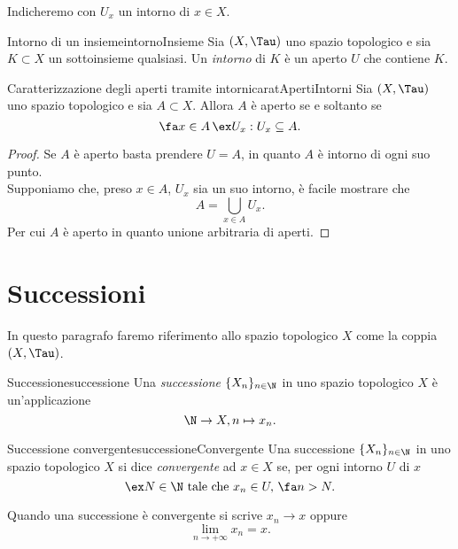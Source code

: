 \begin{notz}
    Indicheremo con \(U_x\) un intorno di \(x\in X\).
\end{notz}

\begin{defn}{Intorno di un insieme}{intornoInsieme}
    Sia \((X,\Tau)\) uno spazio topologico e sia \(K\subset X\) un sottoinsieme qualsiasi.
    Un \emph{intorno} di \(K\) è un aperto \(U\) che contiene \(K\).
\end{defn}

\begin{prop}{Caratterizzazione degli aperti tramite intorni}{caratApertiIntorni}
    Sia \((X,\Tau)\) uno spazio topologico e sia \(A\subset X\).
    Allora \(A\) è aperto se e soltanto se
    \[
        \fa x\in A \,\ex U_x:U_x\subseteq A.
    \]
\end{prop}

\begin{proof}
    \graffito{\(\Rightarrow)\)}Se \(A\) è aperto basta prendere \(U=A\), in quanto \(A\) è intorno di ogni suo punto.\\
    \graffito{\(\Leftarrow)\)}Supponiamo che, preso \(x\in A\), \(U_x\) sia un suo intorno, è facile mostrare che
    \[
        A=\bigcup_{x\in A}U_x.
    \]
    Per cui \(A\) è aperto in quanto unione arbitraria di aperti.
\end{proof}
\section{Successioni}

In questo paragrafo faremo riferimento allo spazio topologico \(X\) come la coppia \((X,\Tau)\).

\begin{defn}{Successione}{successione}
    Una \emph{successione} \(\{X_n\}_{n\in\N}\) in uno spazio topologico \(X\) è un'applicazione
    \[
        \N\to X,n\mapsto x_n.
    \]
\end{defn}

\begin{defn}{Successione convergente}{successioneConvergente}
    Una successione \(\{X_n\}_{n\in\N}\) in uno spazio topologico \(X\) si dice \emph{convergente} ad \(x\in X\) se, per ogni intorno \(U\) di \(x\)
    \[
        \ex N\in\N\text{ tale che }x_n\in U,\,\fa n>N.
    \]
\end{defn}

\begin{notz}
    Quando una successione è convergente si scrive \(x_n\to x\) oppure
    \[
        \lim_{n\to +\infty} x_n=x.
    \]
\end{notz}

